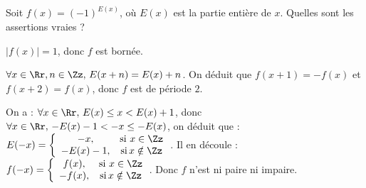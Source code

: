 \begin{question} 

Soit $f(x)= (-1)^{E(x)}$, où  $E(x)$ est la partie entière de $x$. Quelles sont les assertions vraies ?
\begin{answers}



\end{answers}
\begin{explanations}
$|f(x)|=1$, donc $f$ est bornée.

$\forall x \in \Rr, n\in \Zz, \, E(x+n)= E(x)+n$. On déduit que  $f(x+1)=-f(x)$ et $f(x+2)=f(x)$, donc $f$ est de période $2$.

On a : $ \forall x \in \Rr, \, E(x)\le x< E(x)+1$,  donc $\forall x \in \Rr, \, -E(x)-1< -x\le - E(x)$, on déduit que : $E(-x)=\left\{\begin{array}{cc}-x,& \mbox{si} \, \, x \in \Zz \\ -E(x)-1,& \mbox{si} \,  x \notin \Zz  \end{array}\right.$. Il en découle :  $f(-x)=\left\{\begin{array}{cc}f(x),& \mbox{si} \, \, x \in \Zz \\ -f(x),& \mbox{si} \,  x \notin \Zz  \end{array}\right.$. Donc $f$ n'est ni paire ni impaire.
\end{explanations}

\end{question}


